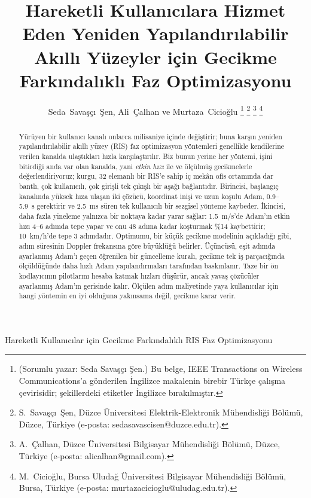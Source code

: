 \documentclass[journal]{IEEEtran}
\begin{document}
\renewcommand{\abstractname}{Özet}
\renewcommand{\IEEEkeywordsname}{Anahtar Kelimeler}
\renewcommand{\figurename}{Şekil}
\renewcommand{\tablename}{Tablo}
\renewcommand{\refname}{Kaynaklar}

\title{Hareketli Kullanıcılara Hizmet Eden Yeniden Yapılandırılabilir Akıllı Yüzeyler için Gecikme Farkındalıklı Faz Optimizasyonu}

\author{Seda~Savaşçı~Şen, Ali~Çalhan ve Murtaza~Cicioğlu%
\thanks{(Sorumlu yazar: Seda Savaşçı Şen.) Bu belge, IEEE Transactions on Wireless Communications'a gönderilen İngilizce makalenin birebir Türkçe çalışma çevirisidir; şekillerdeki etiketler İngilizce bırakılmıştır.}%
\thanks{S.~Savaşçı~Şen, Düzce Üniversitesi Elektrik-Elektronik Mühendisliği Bölümü, Düzce, Türkiye (e-posta: sedasavascisen@duzce.edu.tr).}%
\thanks{A.~Çalhan, Düzce Üniversitesi Bilgisayar Mühendisliği Bölümü, Düzce, Türkiye (e-posta: alicalhan@gmail.com).}%
\thanks{M.~Cicioğlu, Bursa Uludağ Üniversitesi Bilgisayar Mühendisliği Bölümü, Bursa, Türkiye (e-posta: murtazacicioglu@uludag.edu.tr).}}

%
{Hareketli Kullanıcılar için Gecikme Farkındalıklı RIS Faz Optimizasyonu}

\maketitle

\begin{abstract}
Yürüyen bir kullanıcı kanalı onlarca milisaniye içinde değiştirir; buna karşın yeniden yapılandırılabilir akıllı yüzey (RIS) faz optimizasyon yöntemleri genellikle kendilerine verilen kanalda ulaştıkları hızla karşılaştırılır. Biz bunun yerine her yöntemi, işini bitirdiği anda var olan kanalda, yani \emph{etkin hızı} ile ve ölçülmüş gecikmelerle değerlendiriyoruz; kurgu, 32 elemanlı bir RIS'e sahip iç mekân ofis ortamında dar bantlı, çok kullanıcılı, çok girişli tek çıkışlı bir aşağı bağlantıdır. Birincisi, başlangıç kanalında yüksek hıza ulaşan iki çözücü, koordinat inişi ve uzun koşulu Adam, 0.9--5.9~s gerektirir ve 2.5~ms süren tek kullanıcılı bir sezgisel yönteme kaybeder. İkincisi, daha fazla yineleme yalnızca bir noktaya kadar yarar sağlar: 1.5~m/s'de Adam'ın etkin hızı 4--6 adımda tepe yapar ve onu 48 adıma kadar koşturmak \%14 kaybettirir; 10~km/h'de tepe 3 adımdadır. Optimumu, bir küçük gecikme modelinin açıkladığı gibi, adım süresinin Doppler frekansına göre büyüklüğü belirler. Üçüncüsü, eşit adımda ayarlanmış Adam'ı geçen öğrenilen bir güncelleme kuralı, gecikme tek iş parçacığında ölçüldüğünde daha hızlı Adam yapılandırmaları tarafından baskınlanır. Taze bir ön kodlayıcının pilotlarını hesaba katmak hızları düşürür, ancak yavaş çözücüler ayarlanmış Adam'ın gerisinde kalır. Ölçülen adım maliyetinde yaya kullanıcılar için hangi yöntemin en iyi olduğuna yakınsama değil, gecikme karar verir.
\end{abstract}
\end{document}
